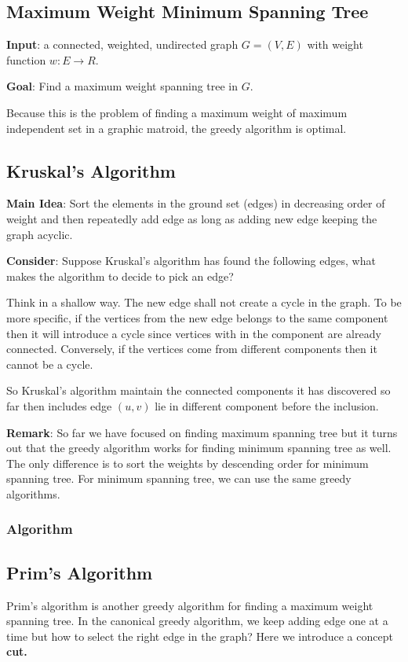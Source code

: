 \subsection{Maximum Weight Minimum Spanning Tree}
\textbf{Input}: a connected, weighted, undirected graph $ G = (V , E) $ with weight function $ w : E \to R $. 

\textbf{Goal}: Find a maximum weight spanning tree in $G$. 

Because this is the problem of finding a maximum weight of maximum independent set in a graphic matroid, the greedy algorithm is optimal.

\subsection{Kruskal's Algorithm}
\textbf{Main Idea}: Sort the elements in the ground set (edges) in decreasing order of weight and then repeatedly add edge as long as adding new edge keeping the graph acyclic.

\textbf{Consider}: Suppose Kruskal's algorithm has found the following edges, what makes the algorithm to decide to pick an edge?

Think in a shallow way. The new edge shall not create a cycle in the graph. To be more specific, if the vertices from the new edge belongs to the same component then it will introduce a cycle since vertices with in the component are already connected. Conversely, if the vertices come from different components then it cannot be a cycle.

So Kruskal's algorithm maintain the connected components it has discovered so far then includes edge $ (u, v) $ lie in different component before the inclusion.

\textbf{Remark}: So far we have focused on finding maximum spanning tree but it turns out that the greedy algorithm works for finding minimum spanning tree as well. The only difference is to sort the weights by descending order for minimum spanning tree. For minimum spanning tree, we can use the same greedy algorithms.

\subsubsection{Algorithm}



\subsection{Prim's Algorithm}
Prim's algorithm is another greedy algorithm for finding a maximum weight spanning tree. In the canonical greedy algorithm, we keep adding edge one at a time but how to select the right edge in the graph? Here we introduce a concept \textbf{cut.}

